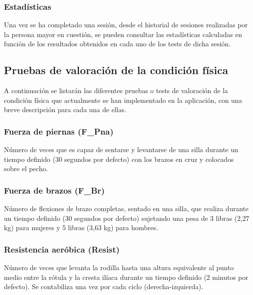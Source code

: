 \subsubsection{Estadísticas}

Una vez se ha completado una sesión, desde el historial de sesiones realizadas por la persona mayor en cuestión, se pueden consultar las estadísticas calculadas en función de los resultados obtenidos en cada uno de los tests de dicha sesión.

\subsection{Pruebas de valoración de la condición física}

A continuación se listarán las diferentes pruebas o tests de valoración de la condición física que actualmente se han implementado en la aplicación, con una breve descripción para cada una de ellas.

\subsubsection{Fuerza de piernas (F\_Pna)}

Número de veces que es capaz de sentarse y levantarse de una silla durante un tiempo definido (30 segundos por defecto) con los brazos en cruz y colocados sobre el pecho.


\subsubsection{Fuerza de brazos (F\_Br)}

Número de flexiones de brazo completas, sentado en una silla, que realiza durante un tiempo definido (30 segundos por defecto) sujetando una pesa de 3 libras (2,27 kg) para mujeres y 5 libras (3,63 kg) para hombres.


\subsubsection{Resistencia aeróbica (Resist)}

Número de veces que levanta la rodilla hasta una altura equivalente al punto medio entre la rótula y la cresta ilíaca durante un tiempo definido (2 minutos por defecto). Se contabiliza una vez por cada ciclo (derecha-izquierda).

